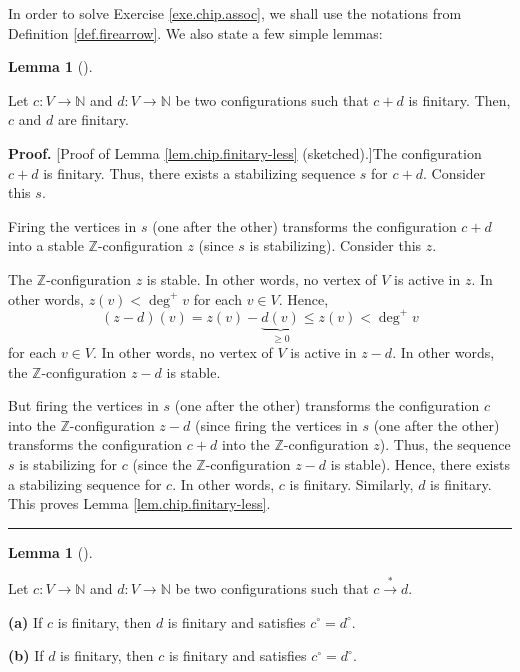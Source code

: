 \documentclass[numbers=enddot,12pt,final,onecolumn,notitlepage]{scrartcl}%
\theoremstyle{definition}
\newtheorem{lem}[theo]{Lemma}
\newenvironment{lemma}[1][]
{\begin{lem}[#1]\begin{leftbar}}
{\end{leftbar}\end{lem}}
\newenvironment{proof}[1][Proof]{\noindent\textbf{#1.} }{\ \rule{0.5em}{0.5em}}
\begin{document}
In order to solve Exercise \ref{exe.chip.assoc}, we shall use the notations
from Definition \ref{def.firearrow}. We also state a few simple lemmas:

\begin{lemma}
\label{lem.chip.finitary-less}Let $c:V\rightarrow\mathbb{N}$ and
$d:V\rightarrow\mathbb{N}$ be two configurations such that $c+d$ is finitary.
Then, $c$ and $d$ are finitary.
\end{lemma}

\begin{proof}
[Proof of Lemma \ref{lem.chip.finitary-less} (sketched).]The configuration
$c+d$ is finitary. Thus, there exists a stabilizing sequence $s$ for $c+d$.
Consider this $s$.

Firing the vertices in $s$ (one after the other) transforms the configuration
$c+d$ into a stable $\mathbb{Z}$-configuration $z$ (since $s$ is stabilizing).
Consider this $z$.

The $\mathbb{Z}$-configuration $z$ is stable. In other words, no vertex of $V$
is active in $z$. In other words, $z\left(  v\right)  <\deg^+ v$ for each
$v\in V$. Hence,
\[
\left(  z-d\right)  \left(  v\right)  =z\left(  v\right)
-\underbrace{d\left(  v\right)  }_{\geq0}\leq z\left(  v\right)  < \deg^+ v
\]
for each $v\in V$. In other words, no vertex of $V$ is active in $z-d$. In
other words, the $\mathbb{Z}$-configuration $z-d$ is stable.

But firing the vertices in $s$ (one after the other) transforms the
configuration $c$ into the $\mathbb{Z}$-configuration $z-d$ (since firing the
vertices in $s$ (one after the other) transforms the configuration $c+d$ into
the $\mathbb{Z}$-configuration $z$). Thus, the sequence $s$ is stabilizing for
$c$ (since the $\mathbb{Z}$-configuration $z-d$ is stable). Hence, there
exists a stabilizing sequence for $c$. In other words, $c$ is finitary.
Similarly, $d$ is finitary. This proves Lemma \ref{lem.chip.finitary-less}.
\end{proof}

\begin{lemma}
\label{lem.chip.finitary-arrow}Let $c:V\rightarrow\mathbb{N}$ and
$d:V\rightarrow\mathbb{N}$ be two configurations such that $c\overset{\ast
}{\rightarrow}d$.

\textbf{(a)} If $c$ is finitary, then $d$ is finitary and satisfies $c^{\circ
}=d^{\circ}$.

\textbf{(b)} If $d$ is finitary, then $c$ is finitary and satisfies $c^{\circ
}=d^{\circ}$.
\end{lemma}
\end{document}
